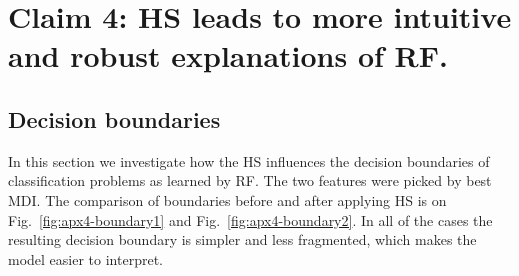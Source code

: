 \section{Claim 4: HS leads to more intuitive and robust explanations of RF.}
\label{appendix:claim4}

\subsection{Decision boundaries}
\label{appendix:claim4-decision}
In this section we investigate how the HS influences the decision boundaries of classification problems as learned by RF. The two features were picked by best MDI. The comparison of boundaries before and after applying HS is on Fig.~\ref{fig:apx4-boundary1} and Fig.~\ref{fig:apx4-boundary2}. In all of the cases the resulting decision boundary is simpler and less fragmented, which makes the model easier to interpret.

